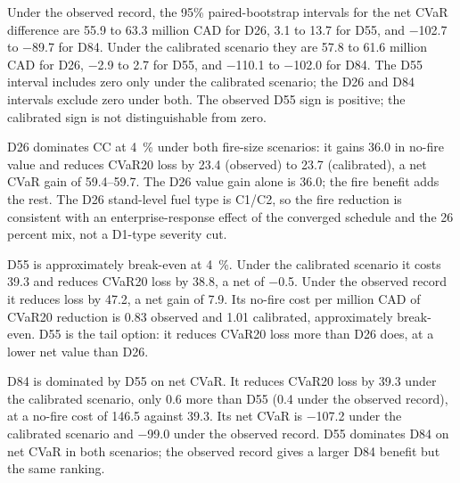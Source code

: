 Under the observed record, the 95\% paired-bootstrap intervals for the net CVaR difference are
55.9 to 63.3 million CAD for D26, 3.1 to 13.7 for D55, and $-$102.7 to $-$89.7 for D84. Under the
calibrated scenario they are 57.8 to 61.6 million CAD for D26, $-$2.9 to 2.7 for D55, and $-$110.1
to $-$102.0 for D84. The D55 interval includes zero only under the calibrated
scenario; the D26 and D84 intervals exclude zero under both. The observed D55 sign is positive; the
calibrated sign is not distinguishable from zero.

D26 dominates CC at \SI{4}{\percent} under both fire-size scenarios: it gains \SI{36.0}{\millionCAD}
in no-fire value and reduces CVaR20 loss by \SI{23.4}{\millionCAD} (observed) to
\SI{23.7}{\millionCAD} (calibrated), a net CVaR gain of \SIrange{59.4}{59.7}{\millionCAD}. The D26
value gain alone is \SI{36.0}{\millionCAD}; the fire benefit adds the rest. The D26 stand-level fuel type is C1/C2, so the fire reduction is consistent with an
enterprise-response effect of the converged schedule and the 26 percent mix, not a D1-type severity
cut.

D55 is approximately break-even at \SI{4}{\percent}. Under the calibrated scenario it costs
\SI{39.3}{\millionCAD} and reduces CVaR20 loss by \SI{38.8}{\millionCAD}, a net of
\SI{-0.5}{\millionCAD}. Under the observed record it reduces loss by \SI{47.2}{\millionCAD}, a net
gain of \SI{7.9}{\millionCAD}. Its no-fire cost per million CAD of CVaR20 reduction is 0.83 observed and 1.01
calibrated, approximately break-even. D55 is the tail option: it reduces CVaR20
loss more than D26 does, at a lower net value than D26.

D84 is dominated by D55 on net CVaR. It reduces CVaR20 loss by \SI{39.3}{\millionCAD} under the calibrated
scenario, only \SI{0.6}{\millionCAD} more than D55 (\SI{0.4}{\millionCAD} under the observed
record), at a no-fire cost of \SI{146.5}{\millionCAD}
against \SI{39.3}{\millionCAD}. Its net CVaR is \SI{-107.2}{\millionCAD} under the calibrated scenario
and \SI{-99.0}{\millionCAD} under the observed record. D55 dominates D84 on net CVaR in both scenarios; the observed record gives a larger D84 benefit but the
same ranking.

